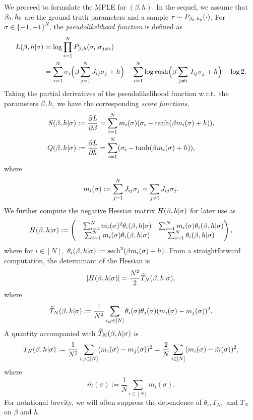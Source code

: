 \documentclass[letterpaper,11pt,reqno]{amsart}
\newcommand{\abs}[1]{\left\vert#1\right\vert}
\newcommand{\mvm}{{m}}
\newcommand{\mvgs}{{\sigma}}
\newcommand{\mvgt}{{\tau}}
\DeclareMathOperator{\sech}{sech}
\begin{document}
We proceed to formulate the MPLE for $(\beta,h).$ In the sequel, we assume that $\beta_0,h_0$ are the ground truth parameters and a sample $\mvgt \sim P_{\gb_0,h_0}(\cdot)$. For $\mvgs \in \{-1,+1\}^N$, the \emph{pseudolikelihood function} is defined as
\begin{align}
  \nonumber  L(\gb, h| \mvgs)& = \log \prod_{i=1}^N P_{\gb, h}(\gs_i | \gs_{j\neq i}) \\
   \label{eq:likeli} & = \sum_{i=1}^N \gs_i \Bigl(\gb \sum_{j=1}^N  J_{ij}\gs_j + h\Bigr) -\sum_{i=1}^N \log \cosh \Bigl(\gb \sum_{j\neq i} J_{ij}\gs_j + h\Bigr) - \log 2.
\end{align}
Taking the partial derivatives of the pseudolikelihood function w.r.t.\ the parameters $\beta,h$, we have the corresponding \emph{score functions},
\begin{align}\label{eq:score}
S(\gb,h|\mvgs)  & :=  \frac{\partial L}{\partial \gb} = \sum_{i=1}^N m_i(\mvgs) ( \gs_i - \tanh(\gb m_i(\mvgs)+h)), \\
Q(\gb,h|\mvgs) & := \frac{\partial L}{\partial h} = \sum_{i=1}^N  ( \gs_i - \tanh(\gb m_i(\mvgs)+h)),\label{eq:score2}
\end{align}
where $$
m_i(\mvgs) := \sum_{j=1}^N J_{ij} \gs_j = \sum_{j\neq i} J_{ij} \gs_j.$$ 
We further compute the negative Hessian matrix $H(\gb,h|\mvgs)$ for later use as
\begin{align}\label{eq:hess}
  H(\gb, h|\mvgs) := \begin{pmatrix}
        &  \sum_{i=1}^N m_i(\mvgs)^2 \theta_i(\gb,h|\mvgs) &  \sum_{i=1}^N m_i(\mvgs) \theta_i(\gb,h|\mvgs) \\
        &  \sum_{i=1}^N m_i(\mvgs) \theta_i(\gb,h|\mvgs)&  \sum_{i=1}^N \theta_i(\gb,h|\mvgs)
    \end{pmatrix},
\end{align}
where for $i\in [N],$
$
\theta_i(\gb,h|\mvgs) := \sech^2(\gb m_i(\mvgs) +h).
$
From a straightforward computation, the determinant of the Hessian is 
\[
\abs{H(\gb,h|\mvgs)} = \frac{N^2}{2}  \widetilde{T}_N(\gb,h|\mvgs),
\]
where
\begin{align}\label{eq:det-hess}
    \widetilde{T}_N(\gb,h|\mvgs) := \frac{1}{N^2} \sum_{i,j\in[N]} \theta_i(\mvgs)\theta_j(\mvgs) (m_i(\mvgs)-m_j(\mvgs))^2.
\end{align}
A quantity accompanied with $\widetilde T_N(\gb,h| \mvgs)$ is 
\begin{align}
  T_N(\gb,h|\mvgs) := \frac{1}{N^2}\sum_{i,j\in[N]} (m_i(\mvgs) - m_j(\mvgs))^2 = \frac2N \sum_{i\in [N]}(m_i(\mvgs) - \bar{\mvm}(\mvgs))^2,
\end{align}
where $$\bar{\mvm}(\mvgs):= \frac1N \sum_{i\in [N]} m_i(\mvgs).$$
For notational brevity, we will often suppress the dependence of $\theta_i, T_N,$ and $\widetilde T_N$ on $\beta$ and $h$.
\end{document}
